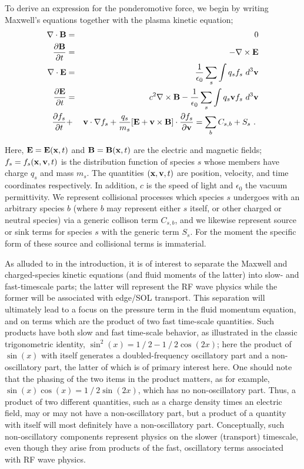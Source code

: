 To derive an expression for the ponderomotive force, 
we begin by writing Maxwell's equations together with the plasma kinetic equation;
\begin{eqnarray}
\nabla \cdot {\bf B} & = & 0 \\
{\partial {\bf B} \over \partial t} & = & - \nabla \times {\bf E} \\
\nabla \cdot {\bf E} & = & {1 \over \epsilon_{0}} \sum_{s} \int q_{s} f_{s}~d^{3}{\bf v} \\
{\partial {\bf E} \over \partial t} & = & c^{2} \nabla \times {\bf B} - {1 \over \epsilon_{0}} \sum_{s} 
\int q_{s} {\bf v} f_{s}~d^{3}{\bf v} \\
{\partial f_{s} \over \partial t} & + & {\bf v} \cdot \nabla f_{s} + {q_{s} \over m_{s}}
[{\bf E} + {\bf v} \times {\bf B}] \cdot {\partial f_{s} \over \partial {\bf v}} = 
\sum_{b} C_{s,b} + S_{s} ~.~
\end{eqnarray} 

Here, ${\bf E}={\bf E}({\bf x},t)$ and ${\bf B}={\bf B}({\bf x},t)$ are the electric and magnetic fields;
$f_{s}=f_{s}({\bf x},{\bf v},t)$ is the distribution function of species $s$ whose members have charge
$q_{s}$ and mass $m_{s}$.  The quantities $({\bf x}, {\bf v}, t)$ are position, velocity, and time coordinates
respectively.
In addition, $c$ is the speed of light and $\epsilon_{0}$ the vacuum permittivity.  We represent
collisional processes which species $s$ undergoes with an arbitrary species $b$ (where $b$ may represent
either $s$ itself, or other charged or neutral species) via a generic collison term $C_{s,b}$, and we likewise
represent source or sink terms for species $s$ with the generic term $S_{s}$.  For the moment the
specific form of these source and collisional terms is immaterial.

As alluded to in the introduction, it is of interest to separate the Maxwell and charged-species 
kinetic equations (and fluid moments of the latter) into slow- and fast-timescale parts; the latter
will represent the RF wave physics while the former will be associated with edge/SOL transport. 
This separation will 
ultimately lead to a focus on the pressure term in the fluid momentum equation, and on terms which 
are the product of two fast time-scale quantities. Such 
products have both slow and fast time-scale behavior, as illustrated in the classic trigonometric 
identity, $\sin^{2}(x) = 1⁄2-1⁄2 \cos(2x)$; here the product of $\sin(x)$ with itself generates a 
doubled-frequency oscillatory part and a non-oscillatory part, the latter of which is of primary 
interest here. One should note that the phasing of the two items in the product matters, as for 
example, $\sin(x) \cos(x) = 1⁄2 \sin(2x)$, which has no non-oscillatory part. Thus, a product of 
two different quantities, such as a charge density times an electric field, may or may not have a 
non-oscillatory part, but a product of a quantity with itself will most definitely have a 
non-oscillatory part.  Conceptually, such non-oscillatory components represent physics on the slower
(transport) timescale, even though they arise from products of the fast, oscillatory terms associated 
with RF wave physics.

